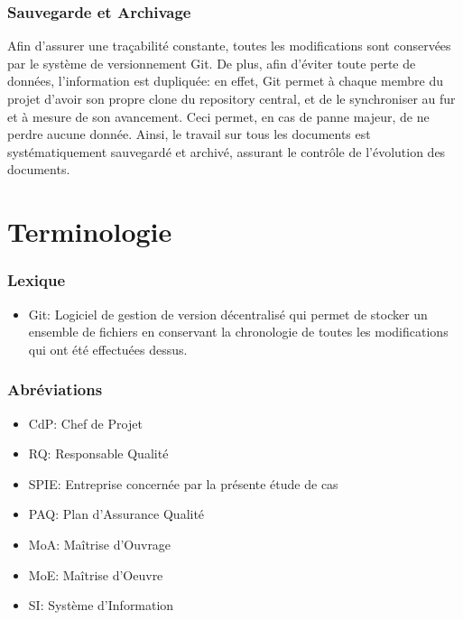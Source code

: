 \documentclass[a4paper, 18pt]{article}
\begin{document}
\section{Sauvegarde et Archivage}

Afin d'assurer une traçabilité constante, toutes les modifications sont conservées par le système de versionnement Git. De plus, afin d'éviter toute perte de données, l'information est dupliquée: en effet, Git permet à chaque membre du projet d'avoir son propre clone du repository central, et de le synchroniser au fur et à mesure de son avancement. Ceci permet, en cas de panne majeur, de ne perdre aucune donnée. Ainsi, le travail sur tous les documents est systématiquement sauvegardé et archivé, assurant le contrôle de l'évolution des documents.

\part{Terminologie}

\section{Lexique}

\begin{itemize}
\item Git: Logiciel de gestion de version décentralisé qui permet de stocker un ensemble de fichiers en conservant la chronologie de toutes les modifications qui ont été effectuées dessus.
\end{itemize}

\section{Abréviations}

\begin{itemize}
\item CdP: Chef de Projet
\item RQ: Responsable Qualité
\item SPIE: Entreprise concernée par la présente étude de cas
\item PAQ: Plan d'Assurance Qualité
\item MoA: Maîtrise d'Ouvrage
\item MoE: Maîtrise d'Oeuvre
\item SI: Système d'Information
\end{itemize}
\end{document}
